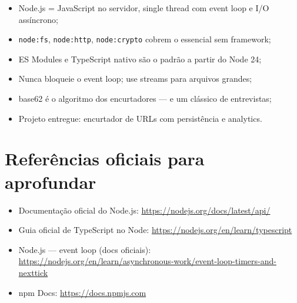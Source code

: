 \begin{itemize}[leftmargin=*, itemsep=0.3em]
  \item Node.js = JavaScript no servidor, single thread com event loop e I/O assíncrono;
  \item \texttt{node:fs}, \texttt{node:http}, \texttt{node:crypto} cobrem o essencial sem framework;
  \item ES Modules e TypeScript nativo são o padrão a partir do Node 24;
  \item Nunca bloqueie o event loop; use streams para arquivos grandes;
  \item base62 é o algoritmo dos encurtadores — e um clássico de entrevistas;
  \item Projeto entregue: encurtador de URLs com persistência e analytics.
\end{itemize}

\section{Referências oficiais para aprofundar}

\begin{itemize}[leftmargin=*, itemsep=0.3em]
  \item Documentação oficial do Node.js: \url{https://nodejs.org/docs/latest/api/}
  \item Guia oficial de TypeScript no Node: \url{https://nodejs.org/en/learn/typescript}
  \item Node.js — event loop (docs oficiais): \url{https://nodejs.org/en/learn/asynchronous-work/event-loop-timers-and-nexttick}
  \item npm Docs: \url{https://docs.npmjs.com}
\end{itemize}
